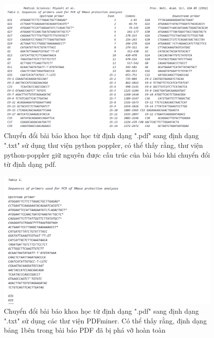 \documentclass[../DoAn.tex]{subfiles}
\begin{document}
\begin{figure}
\centering
\includegraphics[width=1.\linewidth]{Hinh_ve/popller.png}
\caption{Chuyển đổi bài báo khoa học từ định dạng ".pdf" sang định dạng ".txt" sử dụng thư viện python poppler\cite{poppler}, có thể thấy rằng, thư viện python-poppler giữ nguyên được cấu trúc của bài báo khi chuyển đổi từ định dạng pdf.}
\label{fig:poppler}
\end{figure}

\begin{figure}
\centering
\includegraphics[width=1.5\linewidth]{Hinh_ve/notPopller.png}
\caption{Chuyển đổi bài báo khoa học từ định dạng ".pdf" sang định dạng ".txt" sử dụng các thư viện PDFminer. Có thể thấy rằng, định dạng bảng 1bên trong bài báo PDF đã bị phá vỡ hoàn toàn}
\label{fig:pdfother}
\end{figure}
\end{document}
